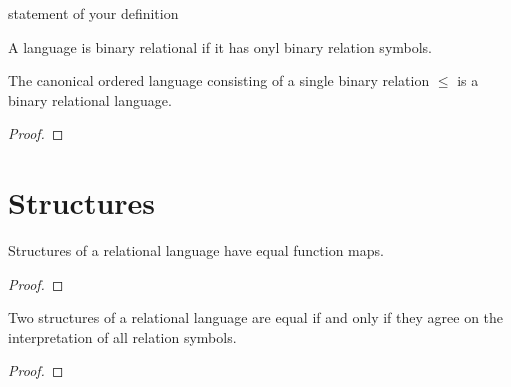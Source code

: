 \begin{definition}
    \label{def:linear-order-instance-models-of-dlo}
    \leanok
    statement of your definition
\end{definition}

\begin{definition}
    \label{def:binary-relational-language}
    \leanok
    A language is binary relational if it has onyl binary relation symbols.
\end{definition}

\begin{lemma}
    \label{lem:canonical-ordered-language-binary-relational}
    \leanok
    The canonical ordered language consisting of a single binary relation $\leq$ is a binary relational language.
\end{lemma}
\begin{proof}
    \leanok
\end{proof}


\section{Structures}

\begin{lemma}
    \label{lem:structure-funmap-relational-language}
    \leanok
    Structures of a relational language have equal function maps. 
\end{lemma}
\begin{proof}
    \leanok
\end{proof}

\begin{lemma}
    \label{lem:equality-of-structures-relational-language}
    \leanok
    Two structures of a relational language are equal if and only if they agree on the 
    interpretation of all relation symbols.
\end{lemma}
\begin{proof}
    \leanok
\end{proof}

